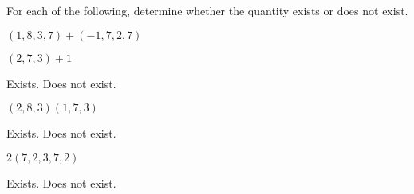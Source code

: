 \begin{problem}
For each of the following, determine whether the quantity exists or does not exist.

$(1,8,3,7)+(-1,7,2,7)$

$(2,7,3)+1$
\begin{multipleChoice}
\choice Exists.
\choice[correct] Does not exist.
\end{multipleChoice}

$(2,8,3)(1,7,3)$
\begin{multipleChoice}
\choice Exists.
\choice[correct] Does not exist.
\end{multipleChoice}

$2(7,2,3,7,2)$
\begin{multipleChoice}
\choice[correct] Exists.
\choice Does not exist.
\end{multipleChoice}

\end{problem}